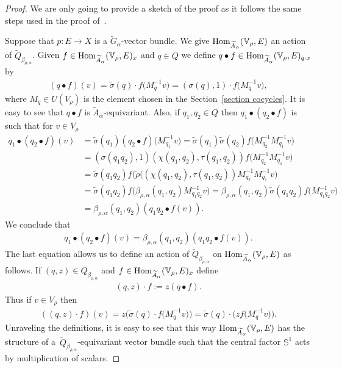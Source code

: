 \documentclass[10pt,a4paper]{amsart}
\def\S{\mathbb{S}}
\def\V{\mathbb{V}}
\DeclareMathOperator{\Hom}{\textup{Hom}}
\theoremstyle{definition}
\numberwithin{equation}{section}
\begin{document}
\begin{proof} We are only going to provide a sketch of the proof as it follows the same
steps used in the proof of~\cite[Theorem 2.1]{GomezUribe}.

Suppose that $p\colon E \rightarrow X$ is a $\widetilde{G}_{\alpha}$-vector bundle. We give
$\Hom_{\widetilde{A}_{\alpha}}(\V_{\rho},E)$ an action of
	$\widetilde{Q}_{\beta_{\rho,\alpha}}$. Given $f \in
\Hom_{\widetilde{A}_{\alpha}}(\V_{\rho},E)_{x}$ and
$q\in Q$ we define $q \bullet f \in
\Hom_{\widetilde{A}_{\alpha}}(\V_{\rho},E)_{q\cdot x}$ by
\begin{gather*}
(q\bullet f)(v)=\tilde{\sigma}(q)\cdot f\big(M_{q}^{-1}v\big)
=(\sigma(q),1) \cdot f\big(M_{q}^{-1}v\big),
\end{gather*}
where $M_{q} \in U(V_{\rho})$ is the element chosen in the Section~\ref{section cocycles}.
It is easy to see that $q \bullet f$ is $\widetilde{A}_{\alpha}$-equivariant. Also,
if $q_{1}, q_{2}\in Q$ then $q_{1}\bullet
(q_{2} \bullet f)$ is such that for $v \in V_{\rho}$
\begin{align*}
q_{1}\bullet(q_{2}\bullet f)(v)&=\tilde{\sigma}(q_{1})
(q_{2}\bullet f)\big(M_{q_{1}}^{-1}v\big)=\tilde{\sigma}(q_{1})\tilde{\sigma}(q_{2})
f\big(M_{q_{2}}^{-1}M_{q_{1}}^{-1}v\big)\\
&=(\sigma(q_{1}q_{2}),1)(\chi(q_{1},q_{2}),\tau(q_{1},q_{2}))
f\big(M_{q_{2}}^{-1}M_{q_{1}}^{-1}v\big)\\
&=\tilde{\sigma}(q_{1}q_{2})f(\tilde{\rho}\big((\chi(q_{1},q_{2}),\tau(q_{1},q_{2}))
M_{q_{2}}^{-1}M_{q_{1}}^{-1}v\big)
\\
&=\tilde{\sigma}(q_{1}q_{2})
f\big(\beta_{\rho,\alpha}(q_{1},q_{2})M_{q_{1}q_{2}}^{-1}v\big)=\beta_{\rho,\alpha}(q_{1},q_{2}) \tilde{\sigma}(q_{1}q_{2})
f\big(M_{q_{1}q_{2}}^{-1}v\big)\\
&=\beta_{\rho,\alpha}(q_{1},q_{2})(q_{1}q_{2}\bullet f(v)).
\end{align*}
We conclude that
\begin{gather*}
q_{1}\bullet(q_{2}\bullet
f)(v)=\beta_{\rho,\alpha}(q_{1},q_{2})(q_{1}q_{2}\bullet f(v)).
\end{gather*}
The last equation allows us to define an action of
$\widetilde{Q}_{\beta_{\rho,\alpha}}$ on
$\Hom_{\widetilde{A}_{\alpha}}(\V_{\rho},E)$ as follows. If
$(q, z) \in Q_{\beta_{\rho,\alpha}}$ and $f \in
\Hom_{\widetilde{A}_{\alpha}}(\V_{\rho},E)_{x}$ define
\begin{gather*}
(q,z)\cdot f:=z(q\bullet f).
\end{gather*}
Thus if $v\in V_{\rho}$ then
\begin{gather*}
((q,z)\cdot f)(v)=z\big(\tilde{\sigma}(q)\cdot f\big(M_{q}^{-1}v\big)\big)=
\tilde{\sigma}(q)\cdot \big(zf\big(M_{q}^{-1}v\big)\big).
\end{gather*}
Unraveling the definitions, it is easy to see that this way
$\Hom_{\widetilde{A}_{\alpha}}(\V_{\rho},E)$ has the structure of
a~$\widetilde{Q}_{\beta_{\rho,\alpha}}$-equivariant vector bundle such that
the central factor $\S^{1}$ acts by multiplication of scalars.


\end{proof}
\end{document}
